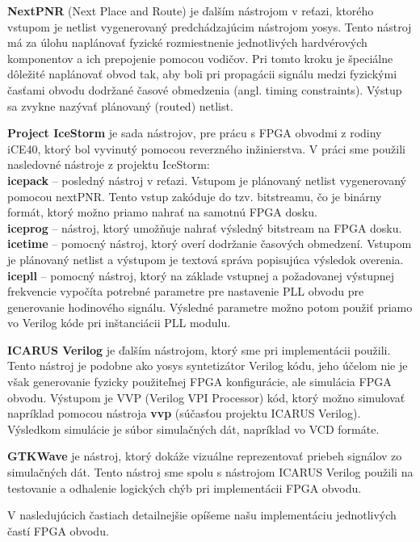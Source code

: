 \textbf{NextPNR} (Next Place and Route) \cite{nextpnr} je ďalším nástrojom v reťazi, ktorého vstupom je netlist vygenerovaný predchádzajúcim nástrojom yosys. Tento nástroj má za úlohu naplánovať fyzické rozmiestnenie jednotlivých hardvérových komponentov a ich prepojenie pomocou vodičov. Pri tomto kroku je špeciálne dôležité naplánovať obvod tak, aby boli pri propagácii signálu medzi fyzickými časťami obvodu dodržané časové obmedzenia (angl. timing constraints). Výstup sa zvykne nazývať plánovaný (routed) netlist.

\textbf{Project IceStorm} \cite{icestorm} je sada nástrojov, pre prácu s FPGA obvodmi z rodiny iCE40, ktorý bol vyvinutý pomocou reverzného inžinierstva. V práci sme použili nasledovné nástroje z projektu IceStorm:\\
\textbf{icepack} -- posledný nástroj v  reťazi. Vstupom je plánovaný netlist vygenerovaný pomocou nextPNR. Tento vstup zakóduje do tzv. bitstreamu, čo je binárny formát, ktorý možno priamo nahrať na samotnú FPGA dosku.\\
\textbf{iceprog} -- nástroj, ktorý umožňuje nahrať výsledný bitstream na FPGA dosku.\\
\textbf{icetime} -- pomocný nástroj, ktorý overí dodržanie časových obmedzení. Vstupom je plánovaný netlist a výstupom je textová správa popisujúca výsledok overenia.\\
\textbf{icepll} -- pomocný nástroj, ktorý na základe vstupnej a požadovanej výstupnej frekvencie vypočíta potrebné parametre pre nastavenie PLL obvodu pre generovanie hodinového signálu. Výsledné parametre možno potom použiť priamo vo Verilog kóde pri inštanciácii PLL modulu.

\textbf{ICARUS Verilog} \cite{iverilog} je ďalším nástrojom, ktorý sme pri implementácii použili. Tento nástroj je podobne ako yosys syntetizátor Verilog kódu, jeho účelom nie je však generovanie fyzicky použiteľnej FPGA konfigurácie, ale simulácia FPGA obvodu. Výstupom je VVP (Verilog VPI Processor) kód, ktorý možno simulovať napríklad pomocou nástroja \textbf{vvp} (súčasťou projektu ICARUS Verilog). Výsledkom simulácie je súbor simulačných dát, napríklad vo VCD formáte.

\textbf{GTKWave} \cite{gtkwave} je nástroj, ktorý dokáže vizuálne reprezentovať priebeh signálov zo simulačných dát. Tento nástroj sme spolu s nástrojom ICARUS Verilog použili na testovanie a odhalenie logických chýb pri implementácii FPGA obvodu.

V nasledujúcich častiach detailnejšie opíšeme našu implementáciu jednotlivých častí FPGA obvodu.

